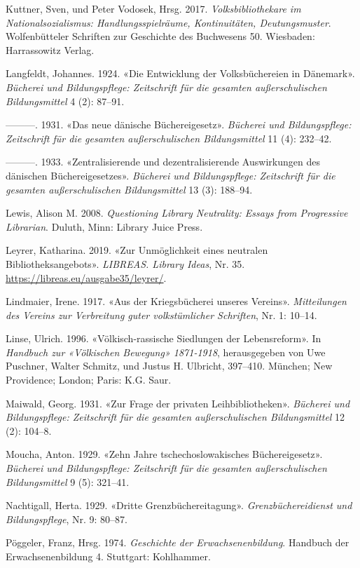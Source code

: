 \documentclass[a4paper,
fontsize=11pt,
oneside,
numbers=noperiodatend,
parskip=half-,
bibliography=totoc,
final
]{scrartcl}
\begin{document}
Kuttner, Sven, und Peter Vodosek, Hrsg. 2017. \emph{Volksbibliothekare
im Nationalsozialismus: Handlungsspielräume, Kontinuitäten,
Deutungsmuster}. Wolfenbütteler Schriften zur Geschichte des Buchwesens
50. Wiesbaden: Harrassowitz Verlag.

Langfeldt, Johannes. 1924. «Die Entwicklung der Volksbüchereien in
Dänemark». \emph{Bücherei und Bildungspflege: Zeitschrift für die
gesamten außerschulischen Bildungsmittel} 4 (2): 87--91.

---------. 1931. «Das neue dänische Büchereigesetz». \emph{Bücherei und
Bildungspflege: Zeitschrift für die gesamten außerschulischen
Bildungsmittel} 11 (4): 232--42.

---------. 1933. «Zentralisierende und dezentralisierende Auswirkungen
des dänischen Büchereigesetzes». \emph{Bücherei und Bildungspflege:
Zeitschrift für die gesamten außerschulischen Bildungsmittel} 13 (3):
188--94.

Lewis, Alison M. 2008. \emph{Questioning Library Neutrality: Essays from
Progressive Librarian}. Duluth, Minn: Library Juice Press.

Leyrer, Katharina. 2019. «Zur Unmöglichkeit eines neutralen
Bibliotheksangebots». \emph{LIBREAS. Library Ideas}, Nr. 35.
\url{https://libreas.eu/ausgabe35/leyrer/}.

Lindmaier, Irene. 1917. «Aus der Kriegsbücherei unseres Vereins».
\emph{Mitteilungen des Vereins zur Verbreitung guter volkstümlicher
Schriften}, Nr. 1: 10--14.

Linse, Ulrich. 1996. «Völkisch-rassische Siedlungen der Lebensreform».
In \emph{Handbuch zur «Völkischen Bewegung» 1871-1918}, herausgegeben
von Uwe Puschner, Walter Schmitz, und Justus H. Ulbricht, 397--410.
München; New Providence; London; Paris: K.G. Saur.

Maiwald, Georg. 1931. «Zur Frage der privaten Leihbibliotheken».
\emph{Bücherei und Bildungspflege: Zeitschrift für die gesamten
außerschulischen Bildungsmittel} 12 (2): 104--8.

Moucha, Anton. 1929. «Zehn Jahre tschechoslowakisches Büchereigesetz».
\emph{Bücherei und Bildungspflege: Zeitschrift für die gesamten
außerschulischen Bildungsmittel} 9 (5): 321--41.

Nachtigall, Herta. 1929. «Dritte Grenzbüchereitagung».
\emph{Grenzbüchereidienst und Bildungspflege}, Nr. 9: 80--87.

Pöggeler, Franz, Hrsg. 1974. \emph{Geschichte der Erwachsenenbildung}.
Handbuch der Erwachsenenbildung 4. Stuttgart: Kohlhammer.
\end{document}
